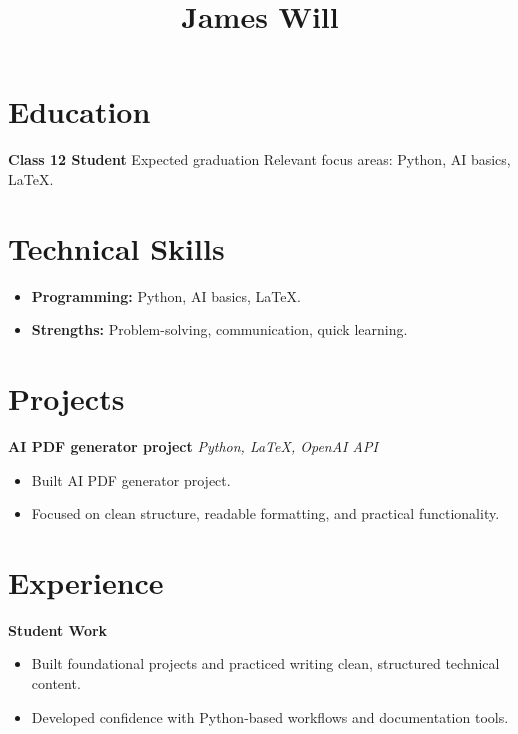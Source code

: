\documentclass[12pt, a4paper]{article}
\title{James Will}
\author{}
\date{}
\begin{document}
\maketitle

\section*{Education}
\textbf{Class 12 Student} \hfill Expected graduation
Relevant focus areas: Python, AI basics, LaTeX.

\section*{Technical Skills}
\begin{itemize}
\item \textbf{Programming:} Python, AI basics, LaTeX.
\item \textbf{Strengths:} Problem-solving, communication, quick learning.
\end{itemize}

\section*{Projects}
\textbf{AI PDF generator project} \hfill \textit{Python, LaTeX, OpenAI API}
\begin{itemize}
\item Built AI PDF generator project.
\item Focused on clean structure, readable formatting, and practical functionality.
\end{itemize}

\section*{Experience}
\textbf{Student Work}
\begin{itemize}
\item Built foundational projects and practiced writing clean, structured technical content.
\item Developed confidence with Python-based workflows and documentation tools.
\end{itemize} 
\end{document}
